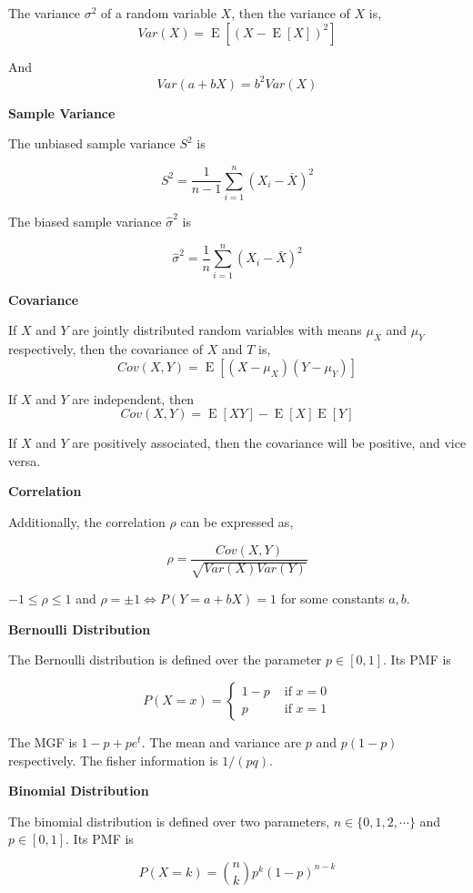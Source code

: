 \documentclass[a4paper]{article}
\newcommand{\subheading}[1]{{\scriptsize\textbf{#1}}}
\newcommand{\expectation}[1]{\operatorname{E}[#1]}
\begin{document}
\begin{multicols*}{4}
The variance $\sigma^2$ of a random variable $X$, then the variance of $X$ is,
$$Var(X) = \expectation{ (X- \expectation{X})^2 }$$

And
$$Var(a + bX) = b^2Var(X)$$

\subheading{Sample Variance}

The unbiased sample variance $S^2$ is

$$S^2 = \frac{1}{n-1} \sum^n_{i=1} (X_i - \bar{X})^2$$

The biased sample variance $\hat{\sigma}^2$ is

$$\hat{\sigma}^2 = \frac{1}{n}\sum^n_{i=1} (X_i - \bar{X})^2$$

\subheading{Covariance}

If $X$ and $Y$ are jointly distributed random variables with means $\mu_X$ and
$\mu_Y$ respectively, then the covariance of $X$ and $T$ is,
$$Cov(X, Y) = \expectation{(X-\mu_X)(Y-\mu_Y)}$$

If $X$ and $Y$ are independent, then
$$Cov(X, Y) = \expectation{XY} - \expectation{X}\expectation{Y}$$

If $X$ and $Y$ are positively associated, then the covariance will be positive,
and vice versa. \smallskip

\subheading{Correlation}

Additionally, the correlation $\rho$ can be expressed as,

$$\rho = \frac{Cov(X, Y)}{\sqrt{Var(X)Var(Y)}}$$

$-1 \leq \rho \leq 1$ and $\rho = \pm 1 \iff P(Y = a + bX) = 1$ for some
constants $a, b$. \smallskip

\subheading{Bernoulli Distribution}

The Bernoulli distribution is defined over the parameter $p \in [0, 1]$. Its PMF
is

$$P(X = x) = \begin{cases}
  1-p & \text{ if $x = 0$} \\
  p   & \text{ if $x = 1$}
\end{cases}$$

The MGF is $1-p + pe^t$. The mean and variance are $p$ and $p(1-p)$
respectively. The fisher information is $1/(pq)$. \smallskip

\subheading{Binomial Distribution}

The binomial distribution is defined over two parameters, $n \in \{0, 1, 2,
\cdots\}$ and $p \in [0, 1]$. Its PMF is

$$P(X=k) = \binom{n}{k}p^k(1-p)^{n-k}$$


\end{multicols*}
\end{document}
